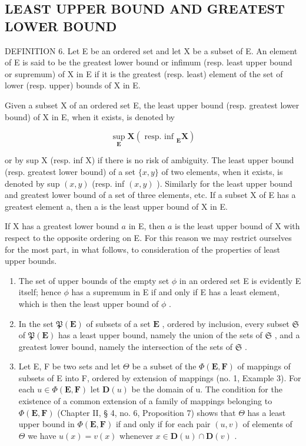 \subsection{LEAST UPPER BOUND AND GREATEST LOWER BOUND}

DEFINITION 6. Let E be an ordered set and let X be a subset of E. An element of E is said to be the greatest lower bound or infimum (resp. least upper bound or supremum) of X in E if it is the greatest (resp. least) element of the set of lower (resp. upper) bounds of X in E.

Given a subset X of an ordered set E, the least upper bound (resp. greatest lower bound) of X in E, when it exists, is denoted by

\[
\sup _ {\mathbf {E}} \mathbf {X} (\text { resp.   inf } _ {\mathbf {E}} \mathbf {X})
\]

or by sup X (resp. inf X) if there is no risk of ambiguity. The least upper bound (resp. greatest lower bound) of a set \(\{x, y\}\) of two elements, when it exists, is denoted by sup \((x, y)\) (resp. inf \((x, y)\) ). Similarly for the least upper bound and greatest lower bound of a set of three elements, etc. If a subset X of E has a greatest element a, then a is the least upper bound of X in E.

If X has a greatest lower bound \(a\) in E, then \(a\) is the least upper bound of X with respect to the opposite ordering on E. For this reason we may restrict ourselves for the most part, in what follows, to consideration of the properties of least upper bounds.


\begin{enumerate}
\def\labelenumi{(\arabic{enumi})}
\item
  The set of upper bounds of the empty set \(\phi\) in an ordered set E is evidently E itself; hence \(\phi\) has a supremum in E if and only if E has a least element, which is then the least upper bound of \(\phi\) .
\item
  In the set \(\mathfrak{P}(\mathbf{E})\) of subsets of a set \(\mathbf{E}\) , ordered by inclusion, every subset \(\mathfrak{S}\) of \(\mathfrak{P}(\mathbf{E})\) has a least upper bound, namely the union of the sets of \(\mathfrak{S}\) , and a greatest lower bound, namely the intersection of the sets of \(\mathfrak{S}\) .
\item
  Let E, F be two sets and let \(\Theta\) be a subset of the \(\Phi(\mathbf{E}, \mathbf{F})\) of mappings of subsets of E into F, ordered by extension of mappings (no. 1, Example 3). For each \(u \in \Phi(\mathbf{E}, \mathbf{F})\) let \(\mathbf{D}(u)\) be the domain of u. The condition for the existence of a common extension of a family of mappings belonging to \(\Phi(\mathbf{E}, \mathbf{F})\) (Chapter II, § 4, no. 6, Proposition 7) shows that \(\Theta\) has a least upper bound in \(\Phi(\mathbf{E}, \mathbf{F})\) if and only if for each pair \((u, v)\) of elements of \(\Theta\) we have \(u(x) = v(x)\) whenever \(x \in \mathbf{D}(u) \cap \mathbf{D}(v)\) .
\end{enumerate}

